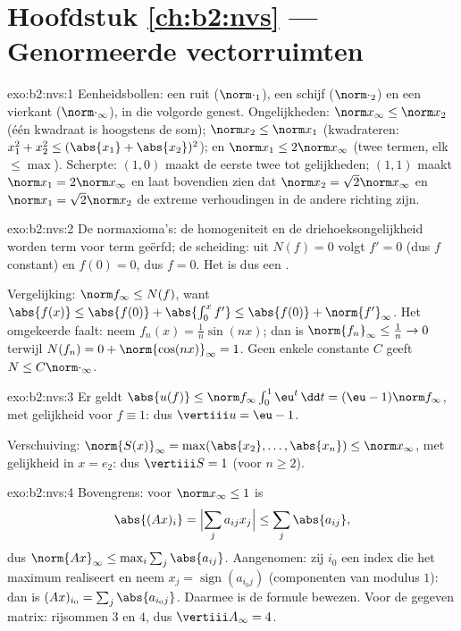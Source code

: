 \section*{Hoofdstuk \ref{ch:b2:nvs} --- Genormeerde vectorruimten}

\begin{solution}{exo:b2:nvs:1}
Eenheidsbollen: een ruit ($\norm\cdot_1$), een schijf
($\norm\cdot_2$) en een vierkant ($\norm\cdot_\infty$), in die
volgorde genest. Ongelijkheden: $\norm x_\infty \leq \norm x_2$
(één kwadraat is hoogstens de som); $\norm x_2 \leq \norm x_1$
(kwadrateren: $x_1^2 + x_2^2 \leq (\abs{x_1} + \abs{x_2})^2$); en
$\norm x_1 \leq 2\norm x_\infty$ (twee termen, elk $\leq \max$).
Scherpte: $(1, 0)$ maakt de eerste twee tot gelijkheden; $(1, 1)$
maakt $\norm x_1 = 2\norm x_\infty$ en laat bovendien zien dat
$\norm x_2 = \sqrt2 \norm x_\infty$ en $\norm x_1 = \sqrt2 \norm
x_2$ de extreme verhoudingen in de andere richting zijn.
\end{solution}

\begin{solution}{exo:b2:nvs:2}
De normaxioma's: de homogeniteit en de driehoeksongelijkheid worden
term voor term geërfd; de scheiding: uit $N(f) = 0$ volgt $f' = 0$
(dus $f$ constant) en $f(0) = 0$, dus $f = 0$. Het is dus een .

Vergelijking: $\norm f_\infty \leq N(f)$, want $\abs{f(x)} \leq
\abs{f(0)} + \abs{\int_0^x f'} \leq \abs{f(0)} +
\norm{f'}_\infty$. Het omgekeerde faalt: neem $f_n(x) = \frac1n
\sin(nx)$; dan is $\norm{f_n}_\infty \leq \frac1n \to 0$ terwijl
$N(f_n) = 0 + \norm{\cos(nx)}_\infty = 1$. Geen enkele constante
$C$ geeft $N \leq C\norm\cdot_\infty$.
\end{solution}

\begin{solution}{exo:b2:nvs:3}
Er geldt $\abs{u(f)} \leq \norm f_\infty \int_0^1 \eu^t\,\dd t =
(\eu - 1)\norm f_\infty$, met gelijkheid voor $f \equiv 1$: dus
$\vertiii u = \eu - 1$.

Verschuiving: $\norm{S(x)}_\infty = \max(\abs{x_2}, \dots,
\abs{x_n}) \leq \norm x_\infty$, met gelijkheid in $x = e_2$: dus
$\vertiii S = 1$ (voor $n \geq 2$).
\end{solution}

\begin{solution}{exo:b2:nvs:4}
Bovengrens: voor $\norm x_\infty \leq 1$ is
\[
\abs{(Ax)_i} = \Bigl|\sum_j a_{ij}x_j\Bigr| \leq \sum_j
\abs{a_{ij}},
\]
dus $\norm{Ax}_\infty \leq \max_i \sum_j \abs{a_{ij}}$.
Aangenomen: zij $i_0$ een index die het maximum realiseert en neem
$x_j = \operatorname{sign}(a_{i_0 j})$ (componenten van modulus
$1$): dan is $(Ax)_{i_0} = \sum_j \abs{a_{i_0 j}}$. Daarmee is de
formule bewezen. Voor de gegeven matrix: rijsommen $3$ en $4$, dus
$\vertiii A_\infty = 4$.
\end{solution}

